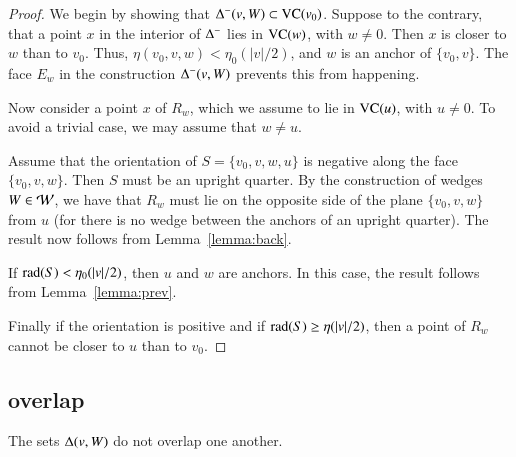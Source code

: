 \begin{proof}
We begin by showing that $\Delta^-(v,W)\subset{\operatorname{VC}}(v_0)$.
Suppose to the contrary, that a point $x$ in the interior of
$\Delta^-$ lies in ${\operatorname{VC}}(w)$, with $w\ne0$.  Then $x$ is closer
to $w$ than to  $v_0$.  Thus, $\eta(v_0,v,w)<\eta_0(|v|/2)$, and $w$
is an anchor of $\{v_0,v\}$.  The face $E_w$ in the construction
$\Delta^-(v,W)$ prevents this from happening.

Now consider a point $x$ of $R_w$, which we assume to lie in
${\operatorname{VC}}(u)$, with $u\ne0$.  To avoid a trivial case, we may
assume that $w\ne u$.

Assume that the orientation of $S=\{v_0,v,w,u\}$ is negative along
the face $\{v_0,v,w\}$.  Then $S$ must be an upright quarter.  By
the construction of wedges $W\in{\mathcal W}$, we have that $R_w$ must
lie on the opposite side of the plane $\{v_0,v,w\}$ from $u$ (for
there is no wedge between the anchors of an upright quarter).  The
result now follows from Lemma~\ref{lemma:back}.

If $\operatorname{rad}(S) <\eta_0(|v|/2)$, then $u$ and $w$ are anchors.  In
this case, the result follows from Lemma~\ref{lemma:prev}.

Finally if the orientation is positive and if $\operatorname{rad}(S)\ge
\eta(|v|/2)$, then a point of $R_w$ cannot be closer to $u$ than
to $v_0$.
\end{proof}


\subsection{overlap}%
    \label{sec:overlap}


\begin{lemma}  The sets $\Delta(v,W)$ do not overlap one another.
\end{lemma}

